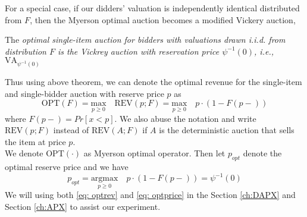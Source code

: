 For a special case, if our didders' valuation is independently identical distributed from $F$, then the Myerson optimal auction becomes a modified Vickery auction,
\begin{theorem} The \textit{optimal single-item auction for bidders with valuations drawn i.i.d. from distribution $F$ is the Vickrey auction with reservation price $\psi^{-1}(0)$, i.e., $\text{VA}_{\psi^{-1}(0)}$}
\end{theorem}
Thus using above theorem, we can denote the optimal revenue for the single-item and single-bidder auction with reserve price $p$ as
\begin{equation}
\label{eq: optrev}
\text{OPT}(F) = \underset{p \geqslant 0}{\text{max}} \quad \text{REV}(p;F) = \underset{p \geqslant 0}{\text{max}} \quad p \cdot \left(1-F(p-)\right) 
\end{equation}
where $F(p-) = Pr[x<p]$. We also abuse the notation and write $\text{REV}(p;F)$ instead of $\text{REV}(A;F)$ if $A$ is the deterministic auction that sells the item at price $p$.\\
We denote $\text{OPT}(\cdot)$ as Myerson optimal operator. Then let $p_{opt}$ denote the optimal reserve price and we have 
\begin{equation}
\label{eq: optprice}
    p_{opt} = \underset{p \geqslant 0}{\text{argmax}} \quad p \cdot \left(1-F(p-)\right) =  \psi^{-1}(0)
\end{equation}
We will using both \cref{eq: optrev} and \cref{eq: optprice} in the Section \ref{ch:DAPX} and Section \ref{ch:APX} to assist our experiment.


